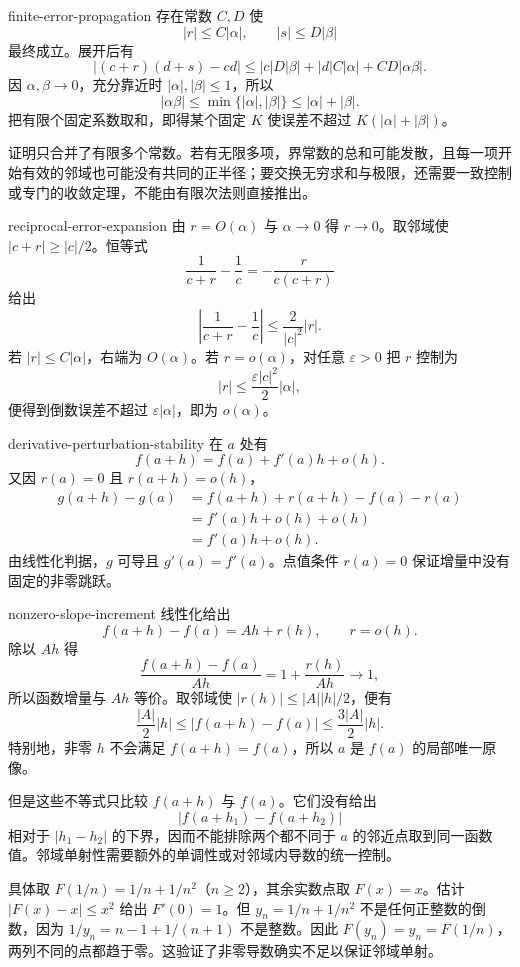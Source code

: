 \begin{solution}{finite-error-propagation}
存在常数 \(C,D\) 使
\[
 |r|\le C|\alpha|,\qquad |s|\le D|\beta|
\]
最终成立。展开后有
\[
 |(c+r)(d+s)-cd|
 \le |c|D|\beta|+|d|C|\alpha|+CD|\alpha\beta|.
\]
因 \(\alpha,\beta\to0\)，充分靠近时 \(|\alpha|,|\beta|\le1\)，所以
\[
 |\alpha\beta|\le\min\{|\alpha|,|\beta|\}
 \le|\alpha|+|\beta|.
\]
把有限个固定系数取和，即得某个固定 \(K\) 使误差不超过 \(K(|\alpha|+|\beta|)\)。

证明只合并了有限多个常数。若有无限多项，界常数的总和可能发散，且每一项开始有效的邻域也可能没有共同的正半径；要交换无穷求和与极限，还需要一致控制或专门的收敛定理，不能由有限次法则直接推出。
\end{solution}

\begin{solution}{reciprocal-error-expansion}
由 \(r=O(\alpha)\) 与 \(\alpha\to0\) 得 \(r\to0\)。取邻域使 \(|c+r|\ge|c|/2\)。恒等式
\[
 \frac1{c+r}-\frac1c=-\frac{r}{c(c+r)}
\]
给出
\[
 \left|\frac1{c+r}-\frac1c\right|
 \le\frac{2}{|c|^2}|r|.
\]
若 \(|r|\le C|\alpha|\)，右端为 \(O(\alpha)\)。若 \(r=o(\alpha)\)，对任意 \(\varepsilon>0\) 把 \(r\) 控制为
\[
 |r|\le\frac{\varepsilon|c|^2}{2}|\alpha|,
\]
便得到倒数误差不超过 \(\varepsilon|\alpha|\)，即为 \(o(\alpha)\)。
\end{solution}

\begin{solution}{derivative-perturbation-stability}
在 \(a\) 处有
\[
 f(a+h)=f(a)+f'(a)h+o(h).
\]
又因 \(r(a)=0\) 且 \(r(a+h)=o(h)\)，
\begin{align*}
 g(a+h)-g(a)
 &=f(a+h)+r(a+h)-f(a)-r(a)\\
 &=f'(a)h+o(h)+o(h)\\
 &=f'(a)h+o(h).
\end{align*}
由线性化判据，\(g\) 可导且 \(g'(a)=f'(a)\)。点值条件 \(r(a)=0\) 保证增量中没有固定的非零跳跃。
\end{solution}

\begin{solution}{nonzero-slope-increment}
线性化给出
\[
 f(a+h)-f(a)=Ah+r(h),\qquad r=o(h).
\]
除以 \(Ah\) 得
\[
 \frac{f(a+h)-f(a)}{Ah}
 =1+\frac{r(h)}{Ah}\longrightarrow1,
\]
所以函数增量与 \(Ah\) 等价。取邻域使 \(|r(h)|\le |A||h|/2\)，便有
\[
 \frac{|A|}{2}|h|
 \le |f(a+h)-f(a)|
 \le\frac{3|A|}{2}|h|.
\]
特别地，非零 \(h\) 不会满足 \(f(a+h)=f(a)\)，所以 \(a\) 是 \(f(a)\) 的局部唯一原像。

但是这些不等式只比较 \(f(a+h)\) 与 \(f(a)\)。它们没有给出
\[
 |f(a+h_1)-f(a+h_2)|
\]
相对于 \(|h_1-h_2|\) 的下界，因而不能排除两个都不同于 \(a\) 的邻近点取到同一函数值。邻域单射性需要额外的单调性或对邻域内导数的统一控制。

具体取 \(F(1/n)=1/n+1/n^2\)（\(n\ge2\)），其余实数点取 \(F(x)=x\)。估计 \(|F(x)-x|\le x^2\) 给出 \(F'(0)=1\)。但 \(y_n=1/n+1/n^2\) 不是任何正整数的倒数，因为 \(1/y_n=n-1+1/(n+1)\) 不是整数。因此 \(F(y_n)=y_n=F(1/n)\)，两列不同的点都趋于零。这验证了非零导数确实不足以保证邻域单射。
\end{solution}

